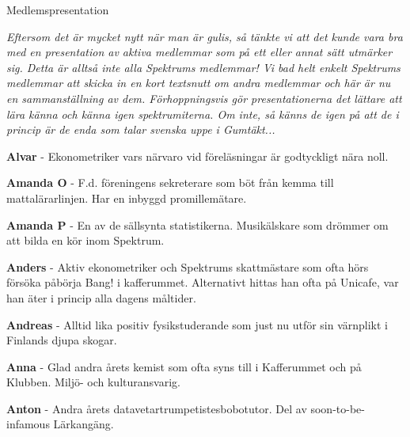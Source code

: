 \documentclass{spektraklet}
\begin{document}
\begin{artikel}{Medlemspresentation}{}

\textit{Eftersom det är mycket nytt när man är gulis, så tänkte vi att det kunde vara bra med en presentation av aktiva medlemmar som på ett eller annat sätt utmärker sig. Detta är alltså inte alla Spektrums medlemmar! Vi bad helt enkelt Spektrums medlemmar att skicka in en kort textsnutt om andra medlemmar och här är nu en sammanställning av dem. Förhoppningsvis gör presentationerna det lättare att lära känna och känna igen spektrumiterna. Om inte, så känns de igen på att de i princip är de enda som talar svenska uppe i Gumtäkt...}

\begin{twocolumns}




\textbf{Alvar} - Ekonometriker vars närvaro vid föreläsningar är godtyckligt nära noll. %

\textbf{Amanda O} - F.d. föreningens sekreterare som böt från kemma till mattalärarlinjen. Har en inbyggd promillemätare. %

\textbf{Amanda P} - En av de sällsynta statistikerna. Musikälskare som drömmer om att bilda en kör inom Spektrum. %

\textbf{Anders} - Aktiv ekonometriker och Spektrums skattmästare som ofta hörs försöka påbörja Bang! i kafferummet. Alternativt hittas han ofta på Unicafe, var han äter i princip alla dagens måltider.

\textbf{Andreas} - Alltid lika positiv fysikstuderande som just nu utför sin värnplikt i Finlands djupa skogar.

\textbf{Anna} - Glad andra årets kemist som ofta syns till i Kafferummet och på Klubben. Miljö- och kulturansvarig.

\textbf{Anton} - Andra årets datavetartrumpetistesbobotutor. Del av soon-to-be-infamous Lärkangäng.


\end{twocolumns}
\end{artikel}
\end{document}
